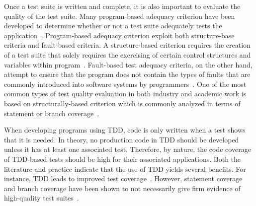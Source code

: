 \documentclass[conference]{IEEEtran}
\begin{document}
Once a test suite is written and complete, it is also important to evaluate the quality of the test suite. Many program-based adequacy criterion have been developed to determine whether or not a test suite adequately tests the application~\cite{weyuker1988evaluation}. Program-based adequacy criterion exploit both structure-base criteria and fault-based criteria. A structure-based criterion requires the creation of a test suite that solely requires the exercising of certain control structures and variables within program~\cite{kapfhammer-testing-handbook}. Fault-based test adequacy criteria, on the other hand, attempt to ensure that the program does not contain the types of faults that are commonly introduced into software systems by programmers~\cite{demillo1978hints, zhu1997software}.  One of the most common types of test quality evaluation in both industry and academic work is based on structurally-based criterion which is commonly analyzed in terms of statement or branch coverage~\cite{weyuker1988evaluation}.

When developing programs using TDD, code is only written when a test shows that it is needed.  In theory, no production code in TDD should be developed unless it has at least one associated test. Therefore, by nature, the code coverage of TDD-based tests should be high for their associated applications. Both the literature and practice indicate that the use of TDD yields several benefits. For instance, TDD leads to improved test coverage~\cite{astels2003test}. However,  statement coverage and branch coverage have been shown to not necessarily give firm evidence of high-quality test suites~\cite{zhu1997software}.%
\end{document}
